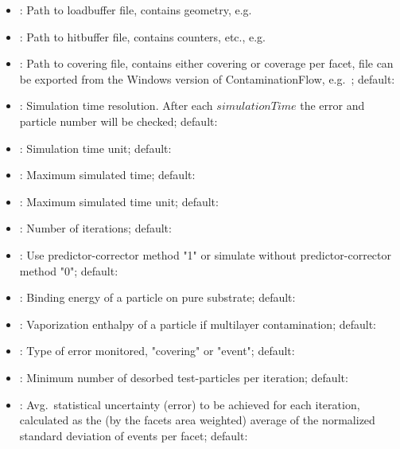\begin{itemize}[noitemsep,topsep=0pt, partopsep=0pt]
\item {}: Path to loadbuffer file, contains geometry, e.g.\ 
\item {}: Path to hitbuffer file, contains counters, etc., e.g.\ 
\item {}: Path to covering file, contains either covering or coverage per facet, file can be exported from the Windows version of ContaminationFlow, e.g.\ ; default: 
\item {}: Simulation time resolution. After each $simulationTime$ the error and particle number will be checked; default: 
\item {}: Simulation time unit; default: 
\item {}: Maximum simulated time; default: 
\item {}: Maximum simulated time unit; default: 
\item {}: Number of iterations; default: 
\item {}: Use predictor-corrector method "1" or simulate without predictor-corrector method "0"; default: 
\item {}: Binding energy of a particle on pure substrate; default:
\item {}: Vaporization enthalpy of a particle if multilayer contamination; default:
\item {}: Type of error monitored, "covering" or "event"; default: 
\item {}: Minimum number of desorbed test-particles per iteration; default: 
\item {}: Avg.\ statistical uncertainty (error) to be achieved for each iteration, calculated as the (by the facets area weighted) average of the normalized standard deviation of events per facet; default: 

\end{itemize}
